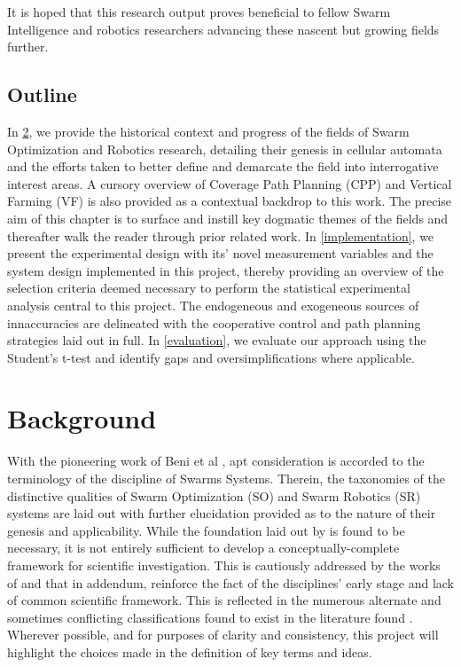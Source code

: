 \documentclass{report}
\begin{document}
It is hoped that this research output proves beneficial to fellow Swarm Intelligence and robotics researchers advancing these nascent but growing fields further.

\section{Outline}

In \ref{background}, we provide the historical context and progress of the fields of Swarm Optimization and Robotics research, detailing their genesis in cellular automata and the efforts taken to better define and demarcate the field into interrogative interest areas. A cursory overview of Coverage Path Planning (CPP) and Vertical Farming (VF) is also provided as a contextual backdrop to this work. The precise aim of this chapter is to surface and instill key dogmatic themes of the fields and thereafter walk the reader through prior related work.  In \ref{implementation}, we present the experimental design with its' novel measurement variables and the system design implemented in this project, thereby providing an overview of the selection criteria deemed necessary to perform the statistical experimental analysis central to this project. The endogeneous and exogeneous sources of innaccuracies are delineated with the cooperative control and path planning strategies laid out in full. In \ref{evaluation}, we evaluate our approach using the Student's t-test \cite{Kennedy1995} and identify gaps and oversimplifications where applicable.

\chapter{Background} \label{background}
With the pioneering work of Beni et al \cite{Beni2005a}, apt consideration is accorded to the terminology of the discipline of Swarms Systems. Therein, the taxonomies of the distinctive qualities of Swarm Optimization (SO) and Swarm Robotics (SR) systems are laid out with further elucidation provided as to the nature of their genesis and applicability. While the foundation laid out by \cite{Beni2005a} is found to be necessary, it is not entirely sufficient to develop a conceptually-complete framework for scientific investigation. This is cautiously addressed by the works of \cite{Iocchi2001} and \cite{Sahin2005} that in addendum, reinforce the fact of the disciplines' early stage and lack of common scientific framework. This is reflected in the numerous alternate and sometimes conflicting classifications found to exist in the literature found \cite{Tan2013}. Wherever possible, and for purposes of clarity and consistency, this project will highlight the choices made in the definition of key terms and ideas.
\end{document}
